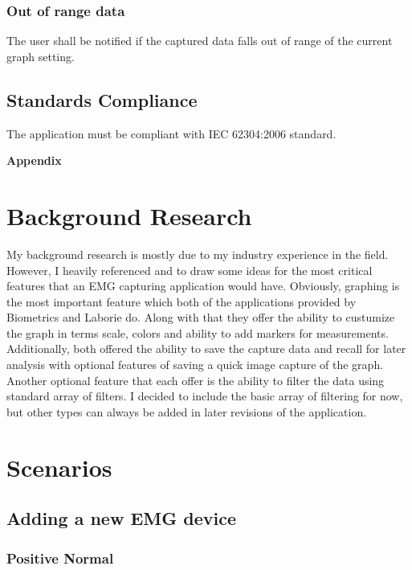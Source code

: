 \documentclass[12pt,a4paper]{article}
\begin{document}
\subsubsection{Out of range data}

The user shall be notified if the captured data falls out of range of the current graph setting.

\subsection{Standards Compliance}

The application must be compliant with IEC 62304:2006 standard.

\newpage
\begin{flushleft}
\textbf{{\Large Appendix}}
\end{flushleft}
\appendix
\section{Background Research}

My background research is mostly due to my industry experience in the field. However, I heavily referenced \cite{Biometrics} and \cite{Laborie}
to draw some ideas for the most critical features that an EMG capturing application would have. Obviously, graphing is the most important feature
which both of the applications provided by Biometrics and Laborie do. Along with that they offer the ability to custumize the graph in terms scale,
colors and ability to add markers for measurements. Additionally, both offered the ability to save the capture data and recall for later analysis 
with optional features of saving a quick image capture of the graph. Another optional feature that each offer is the ability to filter the data using
standard array of filters. I decided to include the basic array of filtering for now, but other types can always be added in later revisions of the application. 

\section{Scenarios}

\subsection{Adding a new EMG device}

\subsubsection{Positive Normal}
\end{document}

